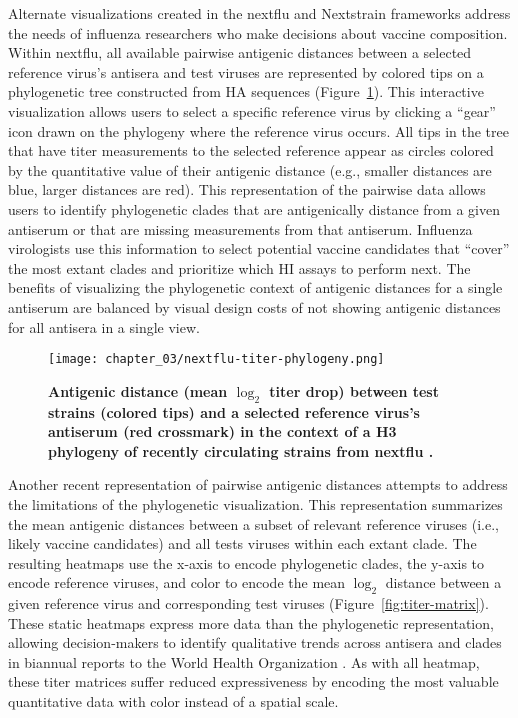 Alternate visualizations created in the nextflu \citep{Neher:2015jr} and Nextstrain \citep{Hadfield2018} frameworks address the needs of influenza researchers who make decisions about vaccine composition.
Within nextflu, all available pairwise antigenic distances between a selected reference virus's antisera and test viruses are represented by colored tips on a phylogenetic tree constructed from HA sequences (Figure~\ref{fig:titer-phylogeny}).
This interactive visualization allows users to select a specific reference virus by clicking a ``gear'' icon drawn on the phylogeny where the reference virus occurs.
All tips in the tree that have titer measurements to the selected reference appear as circles colored by the quantitative value of their antigenic distance (e.g., smaller distances are blue, larger distances are red).
This representation of the pairwise data allows users to identify phylogenetic clades that are antigenically distance from a given antiserum or that are missing measurements from that antiserum.
Influenza virologists use this information to select potential vaccine candidates that ``cover'' the most extant clades and prioritize which HI assays to perform next.
The benefits of visualizing the phylogenetic context of antigenic distances for a single antiserum are balanced by visual design costs of not showing antigenic distances for all antisera in a single view.

\begin{figure}
  \centering
  \texttt{[image: chapter\_03/nextflu-titer-phylogeny.png]}
  \caption[{Antigenic distance (mean $\log_{2}$ titer drop) between test strains (colored tips) and a selected reference virus's antiserum (red crossmark) in the context of a H3 phylogeny of recently circulating strains from nextflu \citep{Neher:2015jr}.}]{\label{fig:titer-phylogeny} {\bf Antigenic distance (mean $\log_{2}$ titer drop) between test strains (colored tips) and a selected reference virus's antiserum (red crossmark) in the context of a H3 phylogeny of recently circulating strains from nextflu \citep{Neher:2015jr}.}}
\end{figure}

Another recent representation of pairwise antigenic distances attempts to address the limitations of the phylogenetic visualization.
This representation summarizes the mean antigenic distances between a subset of relevant reference viruses (i.e., likely vaccine candidates) and all tests viruses within each extant clade.
The resulting heatmaps use the x-axis to encode phylogenetic clades, the y-axis to encode reference viruses, and color to encode the mean $\log_{2}$ distance between a given reference virus and corresponding test viruses (Figure~\ref{fig:titer-matrix}).
These static heatmaps express more data than the phylogenetic representation, allowing decision-makers to identify qualitative trends across antisera and clades in biannual reports to the World Health Organization \citep{Bedford271114,Bedford780627}.
As with all heatmap, these titer matrices suffer reduced expressiveness by encoding the most valuable quantitative data with color instead of a spatial scale.

